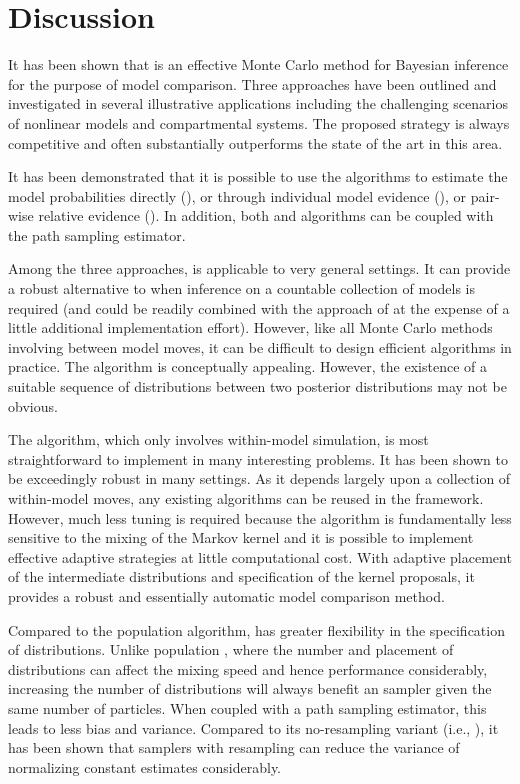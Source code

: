 \section{Discussion}
\label{sec:Bayesian SMC discussion}

It has been shown that \smc is an effective Monte Carlo method for Bayesian
inference for the purpose of model comparison. Three approaches have been
outlined and investigated in several illustrative applications including the
challenging scenarios of nonlinear \ode models and \pet compartmental systems.
The proposed strategy is always competitive and often substantially
outperforms the state of the art in this area.

It has been demonstrated that it is possible to use the \smc algorithms to
estimate the model probabilities directly (\smc[1]), or through individual
model evidence (\smc[2]), or pair-wise relative evidence (\smc[3]). In
addition, both \smc[2] and \smc[3] algorithms can be coupled with the path
sampling estimator.

Among the three approaches, \smc[1] is applicable to very general settings. It
can provide a robust alternative to \rjmcmc when inference on a countable
collection of models is required (and could be readily combined with the
approach of \cite{Jasra:2008bb} at the expense of a little additional
implementation effort). However, like all Monte Carlo methods involving
between model moves, it can be difficult to design efficient algorithms in
practice. The \smc[3] algorithm is conceptually appealing. However, the
existence of a suitable sequence of distributions between two posterior
distributions may not be obvious.

The \smc[2] algorithm, which only involves within-model simulation, is most
straightforward to implement in many interesting problems. It has been shown
to be exceedingly robust in many settings. As it depends largely upon a
collection of within-model \mcmc moves, any existing \mcmc algorithms can be
reused in the \smc[2] framework. However, much less tuning is required because
the algorithm is fundamentally less sensitive to the mixing of the Markov
kernel and it is possible to implement effective adaptive strategies at little
computational cost. With adaptive placement of the intermediate distributions
and specification of the \mcmc kernel proposals, it provides a robust and
essentially automatic model comparison method.

Compared to the population \mcmc algorithm, \smc[2] has greater flexibility in
the specification of distributions. Unlike population \mcmc, where the number
and placement of distributions can affect the mixing speed and hence
performance considerably, increasing the number of distributions will always
benefit an \smc sampler given the same number of particles. When coupled with a
path sampling estimator, this leads to less bias and variance. Compared to its
no-resampling variant (i.e., \aic), it has been shown that \smc samplers with
resampling can reduce the variance of normalizing constant estimates
considerably.

